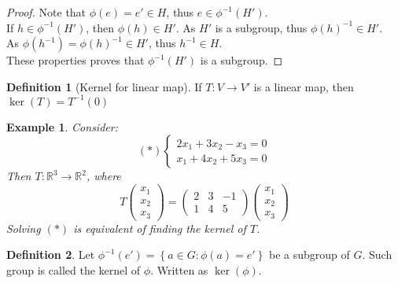 \documentclass{article}
\theoremstyle{MyNonumberplain}
\theoremstyle{break}
\newtheorem*{proof}{Proof. }
\newcommand{\p}{\phi}
\theoremstyle{break}
\newtheorem{example}{Example}[section]
\theoremstyle{break}
\theoremstyle{definition}
\theoremstyle{break}
\newtheorem{definition}{Definition}[section]
\begin{document}
\begin{thmbox}
\begin{prfbox}
\begin{proof}
            Note that $\p (e) = e' \in H$, thus $e \in \p^{- 1} (H')$.\\

            If $h \in \p^{- 1} (H')$, then $\p (h) \in H'$. As $H'$ is a subgroup, thus
            $\p (h)^{- 1} \in H'$.\\

            As $\p (h^{- 1}) = \p (h)^{- 1} \in H'$, thus $h^{- 1} \in H$.\\

            These properties proves that $\p^{- 1} (H')$ is a subgroup.
        \end{proof}
    \end{prfbox}
\end{thmbox}


\begin{defbox}
    \begin{definition}[Kernel for linear map]
        If $T : V \rightarrow V'$ is a linear map, then $\ker (T) = T^{- 1} (0)$
    \end{definition}
\end{defbox}

\begin{expbox}
    \begin{example}
        Consider:
\[ (\ast) \left\{\begin{array}{l}
     2 x_1 + 3 x_2 - x_3 = 0\\
     x_1 + 4 x_2 + 5 x_3 = 0
   \end{array}\right. \]
Then $T : \mathbb{R}^3 \rightarrow \mathbb{R}^2$, where
\[ T \left(\begin{array}{c}
     x_1\\
     x_2\\
     x_3
   \end{array}\right) = \left(\begin{array}{ccc}
     2 & 3 & - 1\\
     1 & 4 & 5
   \end{array}\right) \left(\begin{array}{c}
     x_1\\
     x_2\\
     x_3
   \end{array}\right) \]
Solving $(\ast)$ is equivalent of finding the kernel of $T$. 
    \end{example}
\end{expbox}

\begin{defbox}
    \begin{definition}
        Let $\p^{- 1} (e') = \left\{ a \in G : \p (a) = e' \right\}$ be a subgroup of
        $G$. Such group is called the kernel of $\p$. Written as $\ker \left(
        \p \right)$.
    \end{definition}
\end{defbox}
\end{document}
